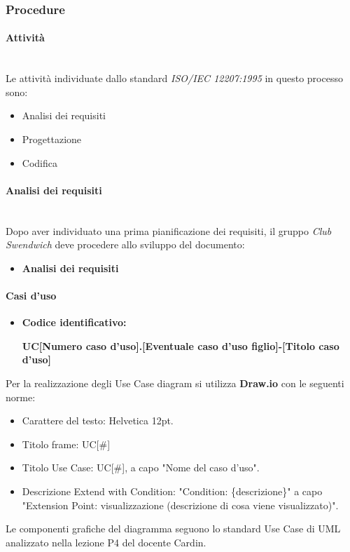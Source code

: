 \subsubsection{Procedure}

\paragraph{Attività}
\mbox{} \\
Le attività individuate dallo standard \textit{ISO/IEC 12207:1995} in questo processo sono:
\begin{itemize}
    \item Analisi dei requisiti
    \item Progettazione
    \item Codifica
\end{itemize}

\paragraph{Analisi dei requisiti}
\mbox{} \\
Dopo aver individuato una prima pianificazione dei requisiti, il gruppo \textit{Club Swendwich}
deve procedere allo sviluppo del documento:
\begin{itemize}
    \item \textbf{Analisi dei requisiti}
\end{itemize}

\paragraph{Casi d'uso}
\begin{itemize}
    \item   \textbf{Codice identificativo:}
            \par \centerline{\textbf{UC[Numero caso d'uso].[Eventuale caso d'uso figlio]-[Titolo caso d'uso]}}
\end{itemize}
Per la realizzazione degli Use Case diagram si utilizza \textbf{Draw.io} con le seguenti norme:
\begin{itemize}
\item Carattere del testo: Helvetica 12pt.
\item Titolo frame: UC[\#]
\item Titolo Use Case: UC[\#], a capo "Nome del caso d'uso".
\item Descrizione Extend with Condition: "Condition: \{descrizione\}" a capo "Extension Point: visualizzazione (descrizione di cosa viene visualizzato)".
\end{itemize}
Le componenti grafiche del diagramma seguono lo standard Use Case di UML analizzato nella lezione P4 del docente Cardin. \\

